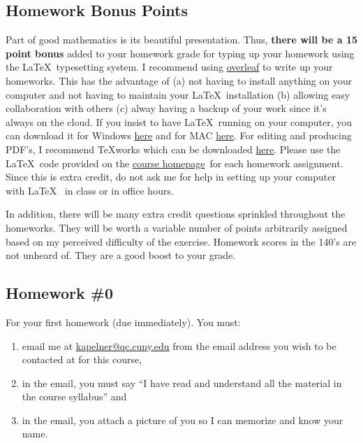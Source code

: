 \documentclass[12pt]{article}
\newcommand{\ingreen}[1]{\color{green}\textbf{#1} \color{black}}
\newcommand{\coursewebpage}{\href{https://github.com/kapelner/QC_Math_241_Spring_2015}{course homepage}}
\newcommand{\qu}[1]{``#1''}
\begin{document}
\subsection*{Homework Bonus Points}

Part of good mathematics is its beautiful presentation. Thus, \ingreen{there will be a 15 point bonus} added to your homework grade  for typing up your homework using the \LaTeX ~typesetting system. I recommend using \href{http://overleaf.com}{overleaf} to write up your homeworks. This has the advantage of (a) not having to install anything on your computer and not having to maintain your \LaTeX ~installation (b) allowing easy collaboration with others (c) alway having a backup of your work since it's always on the cloud. If you insist to have \LaTeX ~running on your computer, you can download it for Windows \href{http://www.miktex.org/download}{here} and for MAC \href{http://www.tug.org/mactex/}{here}. For editing and producing PDF's, I recommend \TeX works which can be downloaded \href{http://www.tug.org/texworks/#Getting_TeXworks}{here}. Please use the \LaTeX ~code provided on the \coursewebpage ~for each homework assignment. Since this is extra credit, do not ask me for help in setting up your computer with \LaTeX~ in class or in office hours.

In addition, there will be many extra credit questions sprinkled throughout the homeworks. They will be worth a variable number of points arbitrarily assigned based on my perceived difficulty of the exercise. Homework scores in the 140's are not unheard of. They are a good boost to your grade.

\subsection*{Homework \#0}

For your first homework (due immediately). You must:

\begin{enumerate}[(1)]
\item email me at \href{kapelner@qc.cuny.edu}{kapelner@qc.cuny.edu} from the email address you wish to be contacted at for this course,
\item in the email, you must say \qu{I have read and understand all the material in the course syllabus} and
\item in the email, you attach a picture of you so I can memorize and know your name.
\end{enumerate}
\end{document}
